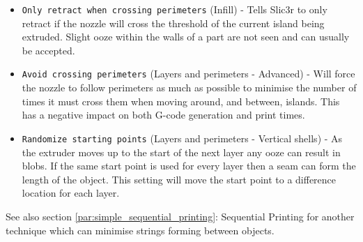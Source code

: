 \begin{itemize}
    \item \texttt{Only retract when crossing perimeters} (Infill) - Tells Slic3r to only retract if the nozzle will cross the threshold of the current island being extruded.  Slight ooze within the walls of a part are not seen and can usually be accepted.
    \item \texttt{Avoid crossing perimeters} (Layers and perimeters - Advanced) - Will force the nozzle to follow perimeters as much as possible to minimise the number of times it must cross them when moving around, and between, islands.  This has a negative impact on both G-code generation and print times.
    \item \texttt{Randomize starting points} (Layers and perimeters - Vertical shells) - As the extruder moves up to the start of the next layer any ooze can result in blobs.  If the same start point is used for every layer then a seam can form the length of the object.  This setting will move the start point to a difference location for each layer.
\end{itemize}


See also section \ref{par:simple_sequential_printing}: Sequential Printing for another technique which can minimise strings forming between objects.
